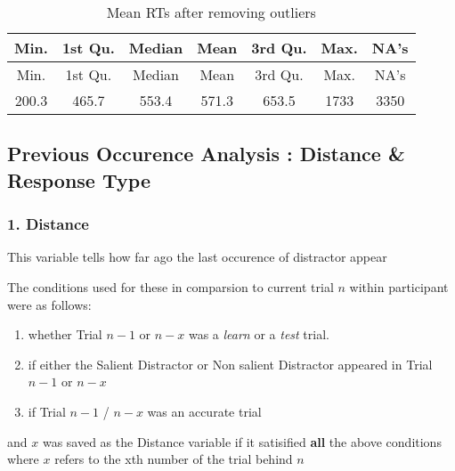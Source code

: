 \documentclass[
]{article}
\providecommand{\tightlist}{%
  \setlength{\itemsep}{0pt}\setlength{\parskip}{0pt}}
\begin{document}
\begin{longtable}[]{@{}ccccccc@{}}
\caption{Mean RTs after removing outliers}\tabularnewline
\toprule
Min. & 1st Qu. & Median & Mean & 3rd Qu. & Max. & NA's\tabularnewline
\midrule
\endfirsthead
\toprule
Min. & 1st Qu. & Median & Mean & 3rd Qu. & Max. & NA's\tabularnewline
\midrule
\endhead
200.3 & 465.7 & 553.4 & 571.3 & 653.5 & 1733 & 3350\tabularnewline
\bottomrule
\end{longtable}

\hypertarget{previous-occurence-analysis-distance-response-type}{%
\subsection{Previous Occurence Analysis : Distance \& Response
Type}\label{previous-occurence-analysis-distance-response-type}}

\hypertarget{distance}{%
\subsubsection{1. Distance}\label{distance}}

This variable tells how far ago the last occurence of distractor appear

The conditions used for these in comparsion to current trial \(n\)
within participant were as follows:

\begin{enumerate}
\def\labelenumi{\arabic{enumi}.}
\tightlist
\item
  whether Trial \(n-1\) or \(n-x\) was a \emph{learn} or a \emph{test}
  trial.
\item
  if either the Salient Distractor or Non salient Distractor appeared in
  Trial \(n-1\) or \(n-x\)
\item
  if Trial \(n-1\) / \(n-x\) was an accurate trial
\end{enumerate}

and \(x\) was saved as the Distance variable if it satisified
\textbf{all} the above conditions where \(x\) refers to the xth number
of the trial behind \(n\)
\end{document}
